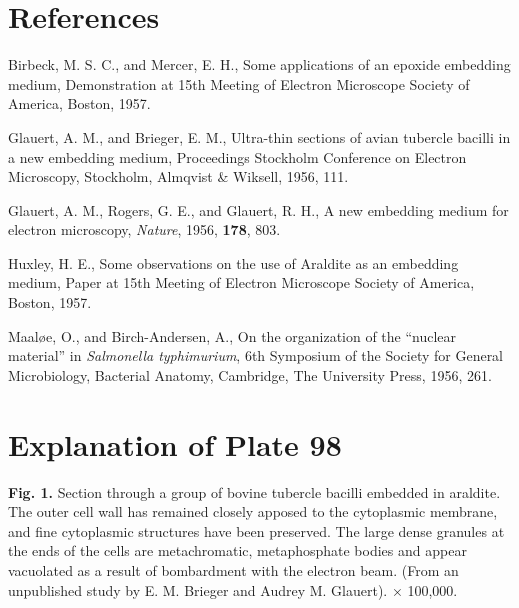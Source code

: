 \documentclass{article}
\begin{document}
\section*{References}

\begin{hangpars}
Birbeck, M. S. C., and Mercer, E. H., Some applications of an epoxide embedding medium, Demonstration at 15th Meeting of Electron Microscope Society of America, Boston, 1957.

Glauert, A. M., and Brieger, E. M., Ultra-thin sections of avian tubercle bacilli in a new embedding medium, Proceedings Stockholm Conference on Electron Microscopy, Stockholm, Almqvist \& Wiksell, 1956, 111.

Glauert, A. M., Rogers, G. E., and Glauert, R. H., A new embedding medium for electron microscopy, \textit{Nature}, 1956, \textbf{178}, 803.

Huxley, H. E., Some observations on the use of Araldite as an embedding medium, Paper at 15th Meeting of Electron Microscope Society of America, Boston, 1957.

Maaløe, O., and Birch-Andersen, A., On the organization of the ``nuclear material'' in \textit{Salmonella typhimurium}, 6th Symposium of the Society for General Microbiology, Bacterial Anatomy, Cambridge, The University Press, 1956, 261.
\end{hangpars}

\section*{Explanation of Plate 98}

\textbf{Fig. 1.} Section through a group of bovine tubercle bacilli embedded in araldite. The outer cell wall has remained closely apposed to the cytoplasmic membrane, and fine cytoplasmic structures have been preserved. The large dense granules at the ends of the cells are metachromatic, metaphosphate bodies and appear vacuolated as a result of bombardment with the electron beam. (From an unpublished study by E. M. Brieger and Audrey M. Glauert). × 100,000.
\end{document}
